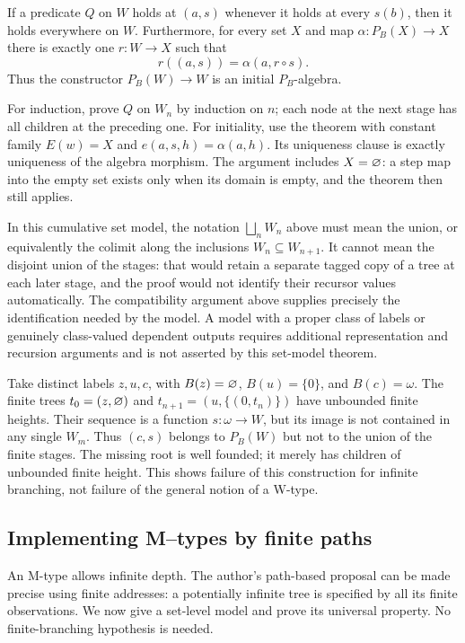 \begin{corollary}
If a predicate $Q$ on $W$ holds at $(a,s)$ whenever it holds at every
$s(b)$, then it holds everywhere on $W$. Furthermore, for every set $X$
and map $\alpha:P_B(X)\to X$ there is exactly one $r:W\to X$ such that
\[
r((a,s))=\alpha(a,r\circ s).
\]
Thus the constructor $P_B(W)\to W$ is an initial $P_B$-algebra.
\end{corollary}
\Proof
For induction, prove $Q$ on $W_n$ by induction on $n$; each node at the
next stage has all children at the preceding one. For initiality, use
the theorem with constant family $E(w)=X$ and
$e(a,s,h)=\alpha(a,h)$. Its uniqueness clause is exactly uniqueness of
the algebra morphism. The argument includes $X=\varnothing$: a step
map into the empty set exists only when its domain is empty, and the
theorem then still applies.
\Done

\begin{remark}
In this cumulative set model, the notation $\bigsqcup_n W_n$ above
must mean the union, or equivalently the colimit along the inclusions
$W_n\subseteq W_{n+1}$. It cannot mean the disjoint union of the stages:
that would retain a separate tagged copy of a tree at each later stage,
and the proof would not identify their recursor values automatically.
The compatibility argument above supplies precisely the identification
needed by the model. A model with a proper class of labels or genuinely
class-valued dependent outputs requires additional representation and
recursion arguments and is not asserted by this set-model theorem.
\end{remark}

\begin{example}
Take distinct labels $z,u,c$, with $B(z)=\varnothing$,
$B(u)=\{0\}$, and $B(c)=\omega$. The finite trees $t_0=(z,\varnothing)$ and
$t_{n+1}=(u,\{(0,t_n)\})$ have unbounded finite heights.
Their sequence is a function $s:\omega\to W$, but its image is not
contained in any single $W_m$. Thus $(c,s)$ belongs to $P_B(W)$ but
not to the union of the finite stages. The missing root is well founded;
it merely has children of unbounded finite height. This shows failure
of this construction for infinite branching, not failure of the general
notion of a W-type.
\end{example}

\pagebreak
\subsection{Implementing M--types by finite paths}
An M-type allows infinite depth. The author's path-based proposal can be
made precise using finite addresses: a potentially infinite tree is
specified by all its finite observations. We now give a set-level model
and prove its universal property. No finite-branching hypothesis is needed.

